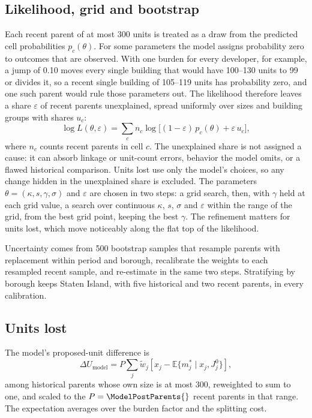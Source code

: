 \documentclass[11pt]{article}
\newcommand{\E}{\mathbb E}
\begin{document}
\subsection{Likelihood, grid and bootstrap}

Each recent parent of at most 300 units is treated as a draw from the predicted cell probabilities $p_c(\theta)$. For some parameters the model assigns probability zero to outcomes that are observed. With one burden for every developer, for example, a jump of 0.10 moves every single building that would have 100--130 units to 99 or divides it, so a recent single building of 105--119 units has probability zero, and one such parent would rule those parameters out. The likelihood therefore leaves a share $\varepsilon$ of recent parents unexplained, spread uniformly over sizes and building groups with shares $u_c$:
\begin{equation}
\log L(\theta,\varepsilon)=\sum_c n_c\log\bigl[(1-\varepsilon)\,p_c(\theta)+\varepsilon\,u_c\bigr],
\label{eq:likelihood}
\end{equation}
where $n_c$ counts recent parents in cell $c$. The unexplained share is not assigned a cause: it can absorb linkage or unit-count errors, behavior the model omits, or a flawed historical comparison. Units lost use only the model's choices, so any change hidden in the unexplained share is excluded. The parameters $\theta=(\kappa,s,\gamma,\sigma)$ and $\varepsilon$ are chosen in two steps: a grid search, then, with $\gamma$ held at each grid value, a search over continuous $\kappa$, $s$, $\sigma$ and $\varepsilon$ within the range of the grid, from the best grid point, keeping the best $\gamma$. The refinement matters for units lost, which move noticeably along the flat top of the likelihood.

Uncertainty comes from 500 bootstrap samples that resample parents with replacement within period and borough, recalibrate the weights to each resampled recent sample, and re-estimate in the same two steps. Stratifying by borough keeps Staten Island, with five historical and two recent parents, in every calibration.

\subsection{Units lost}

The model's proposed-unit difference is
\begin{equation}
\Delta U_{\mathrm{model}}
=P\sum_j\widetilde w_j
\left[x_j-\E\{m_j^*\mid x_j,J_j^0\}\right],
\label{eq:modelunits}
\end{equation}
among historical parents whose own size is at most 300, reweighted to sum to one, and scaled to the $P=\ModelPostParents{}$ recent parents in that range. The expectation averages over the burden factor and the splitting cost.
\end{document}
